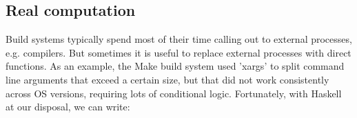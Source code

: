 

%
%
%
%

\subsection{Real computation\label{sec:real_code}}

Build systems typically spend most of their time calling out to external
processes, e.g. compilers. But sometimes it is useful to replace external processes
with direct functions. As an example, the Make build system used \lst'xargs' to
split command line arguments that exceed a certain size, but that did not work
consistently across OS versions, requiring lots of conditional logic.
Fortunately, with Haskell at our disposal, we can write:

